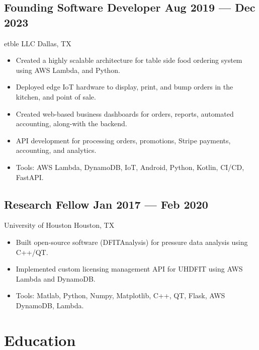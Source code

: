 \documentclass[letter,10pt]{article}
\newcommand{\subtext}[1]{
	#1\par\vspace{-0.2cm}}
\newenvironment{zitemize}{
	\begin{itemize}\itemsep0pt \parskip0pt \parsep1pt}
	{\end{itemize}\vspace{-0.5cm}}
\begin{document}
	\vspace{0.3 cm}
	\subsection*{Founding Software Developer \hfill Aug 2019 --- Dec 2023} 
	\subtext{etble LLC \hfill Dallas, TX} 
	\begin{zitemize}
		\item Created a highly scalable architecture for table side food ordering system using AWS Lambda, and Python.
		\item Deployed edge IoT hardware to display, print, and bump orders in the kitchen, and point of sale.
		\item Created web-based business dashboards for orders, reports, automated accounting, along-with the backend.
		\item API development for processing orders, promotions, Stripe payments, accounting, and analytics.
		\item Tools: AWS Lambda, DynamoDB, IoT, Android, Python, Kotlin, CI/CD, FastAPI.
	\end{zitemize}

	\vspace{0.3 cm}
	\subsection*{Research Fellow \hfill Jan 2017 --- Feb 2020} 
	\subtext{University of Houston \hfill Houston, TX} 
	\begin{zitemize}
		\item Built open-source software (DFITAnalysis) for pressure data analysis using C++/QT.
		\item Implemented custom licensing management API for UHDFIT using AWS Lambda and DynamoDB.
		\item Tools: Matlab, Python, Numpy, Matplotlib, C++, QT, Flask, AWS DynamoDB, Lambda.
	\end{zitemize}
	
	
	
	\section{Education }
\end{document}
